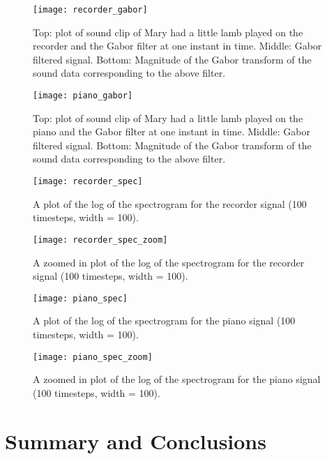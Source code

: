 \documentclass[fleqn,10pt]{../SelfArx} %
\begin{document}
\begin{figure}
\centering
\texttt{[image: recorder\_gabor]}
\caption{Top: plot of sound clip of Mary had a little lamb played on the recorder and the Gabor filter at one instant in time. Middle: Gabor filtered signal. Bottom: Magnitude of the Gabor transform of the sound data corresponding to the above filter.}
\label{fig:recorder_gabor}
\end{figure}

\begin{figure}
\centering
\texttt{[image: piano\_gabor]}
\caption{Top: plot of sound clip of Mary had a little lamb played on the piano and the Gabor filter at one instant in time. Middle: Gabor filtered signal. Bottom: Magnitude of the Gabor transform of the sound data corresponding to the above filter.}
\label{fig:piano_gabor}
\end{figure}

\begin{figure}
\centering
\texttt{[image: recorder\_spec]}
\caption{A plot of the log of the spectrogram for the recorder signal (100 timesteps, width = 100).}
\label{fig:recorder_spec}
\end{figure}

\begin{figure}
\centering
\texttt{[image: recorder\_spec\_zoom]}
\caption{A zoomed in plot of the log of the spectrogram for the recorder signal (100 timesteps, width = 100).}
\label{fig:recorder_spec_zoomed}
\end{figure}

\begin{figure}
\centering
\texttt{[image: piano\_spec]}
\caption{A plot of the log of the spectrogram for the piano signal (100 timesteps, width = 100).}
\label{fig:piano_spec}
\end{figure}

\begin{figure}
\centering
\texttt{[image: piano\_spec\_zoom]}
\caption{A zoomed in plot of the log of the spectrogram for the piano signal (100 timesteps, width = 100).}
\label{fig:piano_spec_zoomed}
\end{figure}




\section{Summary and Conclusions} %
\label{sec:summary_and_conclusions}
\end{document}
